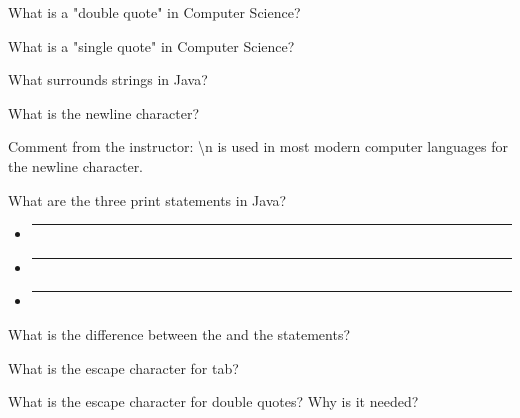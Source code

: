 \documentclass[letterpaper,12pt]{exam}
\begin{document}
\begin{questions}
\begin{samepage}
	\question What is a "double quote" in Computer Science?
	\vspace{5mm}
\end{samepage}

\begin{samepage}
	\question What is a "single quote" in Computer Science?
	\vspace{5mm}
\end{samepage}


\begin{samepage}
	\question What surrounds strings in Java?  
	\vspace{5mm}
\end{samepage}


\begin{samepage}
	\question What is the newline character?
	\vspace{5mm}
\end{samepage}

Comment from the instructor:  \textbackslash n is used in most modern computer languages for the newline character. 

\begin{samepage}
	\question What are the three print statements in Java?
	  \begin{itemize}
		\vspace{5mm}
		\item \rule{80mm}{0.15mm}
		\vspace{5mm}
		\item \rule{80mm}{0.15mm}
		\vspace{5mm}
		\item \rule{80mm}{0.15mm}
	   \end{itemize}
\end{samepage}

\begin{samepage}
	\question What is the difference between the  and the  statements?
	\vspace{5mm}
\end{samepage}

\begin{samepage}
	\question What is the escape character for tab?
	\vspace{5mm}
\end{samepage}

\begin{samepage}
	\question What is the escape character for double quotes?  Why is it needed?
	\vspace{5mm}
\end{samepage}


\end{questions}
\end{document}
